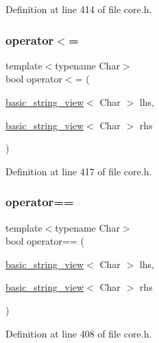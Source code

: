 Definition at line 414 of file core.\+h.

\mbox{\label{classbasic__string__view_a9b92d9c7a937c6945253fd8adfba7803}} 
\subsubsection{\texorpdfstring{operator$<$=}{operator<=}}
{\footnotesize\ttfamily template$<$typename Char$>$ \\
bool operator$<$= (\begin{DoxyParamCaption}\item[{\hyperlink{classbasic__string__view}{basic\+\_\+string\+\_\+view}$<$ Char $>$}]{lhs,  }\item[{\hyperlink{classbasic__string__view}{basic\+\_\+string\+\_\+view}$<$ Char $>$}]{rhs }\end{DoxyParamCaption})\hspace{0.3cm}{\ttfamily [friend]}}



Definition at line 417 of file core.\+h.

\mbox{\label{classbasic__string__view_abbcc283ebd35db4ae2d5365a0861a2e2}} 
\subsubsection{\texorpdfstring{operator==}{operator==}}
{\footnotesize\ttfamily template$<$typename Char$>$ \\
bool operator== (\begin{DoxyParamCaption}\item[{\hyperlink{classbasic__string__view}{basic\+\_\+string\+\_\+view}$<$ Char $>$}]{lhs,  }\item[{\hyperlink{classbasic__string__view}{basic\+\_\+string\+\_\+view}$<$ Char $>$}]{rhs }\end{DoxyParamCaption})\hspace{0.3cm}{\ttfamily [friend]}}



Definition at line 408 of file core.\+h.

